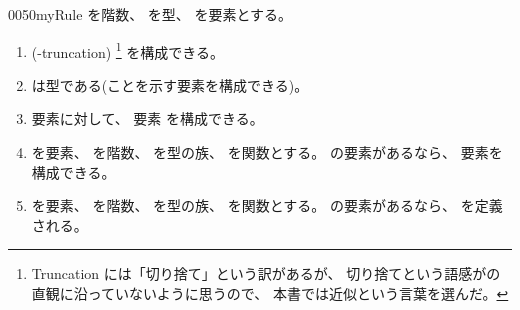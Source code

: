 \documentclass[index]{subfiles}
\begin{document}
\begin{myBlock}{0050}{myRule}
  を階数、
  を型、
  を要素とする。
  \begin{enumerate}
  \item {}
    (-truncation)
    \footnote{Truncation には「切り捨て」という訳があるが、
      切り捨てという語感がの直観に沿っていないように思うので、
      本書では近似という言葉を選んだ。}
    を構成できる。
  \item {}は型である(ことを示す要素を構成できる)。
  \item 要素に対して、
    要素
    を構成できる。
  \item {}を要素、
    を階数、
    を型の族、
    を関数とする。
    の要素があるなら、
    要素を構成できる。
  \item {}を要素、
    を階数、
    を型の族、
    を関数とする。
    の要素があるなら、
    を定義される。
  \end{enumerate}
\end{myBlock}
\end{document}
